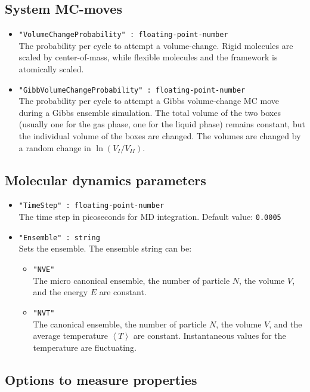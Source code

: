 \subsection{System MC-moves}

\begin{itemize}
\item{\verb+"VolumeChangeProbability" : floating-point-number+}\\
The probability per cycle to attempt a volume-change. 
Rigid molecules are scaled by center-of-mass, while flexible molecules and the framework is atomically scaled.
\item{\verb+"GibbVolumeChangeProbability" : floating-point-number+}\\
The probability per cycle to attempt a Gibbs volume-change MC move during a Gibbs ensemble simulation. The total volume of the two boxes
(usually one for the gas phase, one for the liquid phase) remains constant, but the individual volume of the boxes are changed.
The volumes are changed by a random change in $\ln(V_I/V_{II})$.
\end{itemize}

\subsection{Molecular dynamics parameters}

\begin{itemize}
\item{\verb+"TimeStep" : floating-point-number+}\\
The time step in picoseconds for MD integration. Default value: \verb+0.0005+
\item{\verb+"Ensemble" : string+}\\
Sets the ensemble. The ensemble string can be:
  \begin{itemize}
  \item{\verb+"NVE"+}\\
  The micro canonical ensemble, the number of particle $N$, the volume $V$, and the energy $E$ are constant.
  \item{\verb+"NVT"+}\\
  The canonical ensemble, the number of particle $N$, the volume $V$, and the average temperature $\left\langle T\right\rangle$
  are constant. Instantaneous values for the temperature are fluctuating.
  \end{itemize}
\end{itemize}

\subsection{Options to measure properties}

